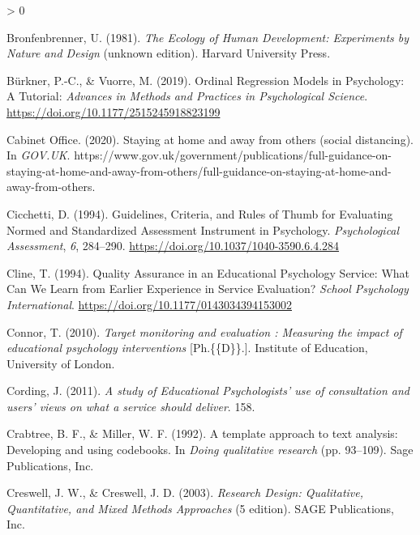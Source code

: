 \documentclass[
  english,
  man]{apa7}
\newlength{\cslhangindent}
\newenvironment{CSLReferences}[2] %
 {%
  \setlength{\parindent}{0pt}
  \ifodd #1 \everypar{\setlength{\hangindent}{\cslhangindent}}\ignorespaces\fi
  \ifnum #2 > 0
  \setlength{\parskip}{#2\baselineskip}
  \fi
 }%
 {}
\begin{document}
\begin{CSLReferences}{1}{0}
\leavevmode\hypertarget{ref-bronfenbrennerEcologyHumanDevelopment1981}{}%
Bronfenbrenner, U. (1981). \emph{The {Ecology} of {Human Development}: {Experiments} by {Nature} and {Design}} (unknown edition). {Harvard University Press}.

\leavevmode\hypertarget{ref-burknerOrdinalRegressionModels2019}{}%
Bürkner, P.-C., \& Vuorre, M. (2019). Ordinal {Regression Models} in {Psychology}: {A Tutorial}: \emph{Advances in Methods and Practices in Psychological Science}. \url{https://doi.org/10.1177/2515245918823199}

\leavevmode\hypertarget{ref-cabinetofficeStayingHomeAway2020}{}%
Cabinet Office. (2020). Staying at home and away from others (social distancing). In \emph{GOV.UK}. https://www.gov.uk/government/publications/full-guidance-on-staying-at-home-and-away-from-others/full-guidance-on-staying-at-home-and-away-from-others.

\leavevmode\hypertarget{ref-cicchettiGuidelinesCriteriaRules1994}{}%
Cicchetti, D. (1994). Guidelines, {Criteria}, and {Rules} of {Thumb} for {Evaluating Normed} and {Standardized Assessment Instrument} in {Psychology}. \emph{Psychological Assessment}, \emph{6}, 284--290. \url{https://doi.org/10.1037/1040-3590.6.4.284}

\leavevmode\hypertarget{ref-clineQualityAssuranceEducational1994a}{}%
Cline, T. (1994). Quality {Assurance} in an {Educational Psychology Service}: {What Can We Learn} from {Earlier Experience} in {Service Evaluation}? \emph{School Psychology International}. \url{https://doi.org/10.1177/0143034394153002}

\leavevmode\hypertarget{ref-connorTargetMonitoringEvaluation2010}{}%
Connor, T. (2010). \emph{Target monitoring and evaluation : Measuring the impact of educational psychology interventions} {[}Ph.\{\{D\}\}.{]}. Institute of Education, University of London.

\leavevmode\hypertarget{ref-cordingStudyEducationalPsychologists2011}{}%
Cording, J. (2011). \emph{A study of {Educational Psychologists}' use of consultation and users' views on what a service should deliver}. 158.

\leavevmode\hypertarget{ref-crabtreeTemplateApproachText1992}{}%
Crabtree, B. F., \& Miller, W. F. (1992). A template approach to text analysis: {Developing} and using codebooks. In \emph{Doing qualitative research} (pp. 93--109). {Sage Publications, Inc}.

\leavevmode\hypertarget{ref-creswellResearchDesignQualitative2003a}{}%
Creswell, J. W., \& Creswell, J. D. (2003). \emph{Research {Design}: {Qualitative}, {Quantitative}, and {Mixed Methods Approaches}} (5 edition). {SAGE Publications, Inc}.


\end{CSLReferences}
\end{document}
